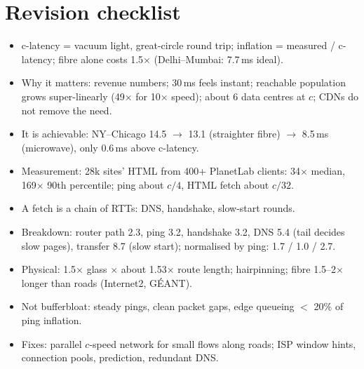 \section{Revision checklist}
\begin{itemize}
  \item c-latency = vacuum light, great-circle round trip; inflation = measured / c-latency; fibre alone costs 1.5$\times$ (Delhi--Mumbai: 7.7\,ms ideal).
  \item Why it matters: revenue numbers; 30\,ms feels instant; reachable population grows super-linearly (49$\times$ for 10$\times$ speed); about 6 data centres at $c$; CDNs do not remove the need.
  \item It is achievable: NY--Chicago 14.5 $\to$ 13.1 (straighter fibre) $\to$ 8.5\,ms (microwave), only 0.6\,ms above c-latency.
  \item Measurement: 28k sites' HTML from 400+ PlanetLab clients: 34$\times$ median, 169$\times$ 90th percentile; ping about $c/4$, HTML fetch about $c/32$.
  \item A fetch is a chain of RTTs: DNS, handshake, slow-start rounds.
  \item Breakdown: router path 2.3, ping 3.2, handshake 3.2, DNS 5.4 (tail decides slow pages), transfer 8.7 (slow start); normalised by ping: 1.7 / 1.0 / 2.7.
  \item Physical: 1.5$\times$ glass $\times$ about 1.53$\times$ route length; hairpinning; fibre 1.5--2$\times$ longer than roads (Internet2, G\'EANT).
  \item Not bufferbloat: steady pings, clean packet gaps, edge queueing $<$ 20\% of ping inflation.
  \item Fixes: parallel $c$-speed network for small flows along roads; ISP window hints, connection pools, prediction, redundant DNS.
\end{itemize}
